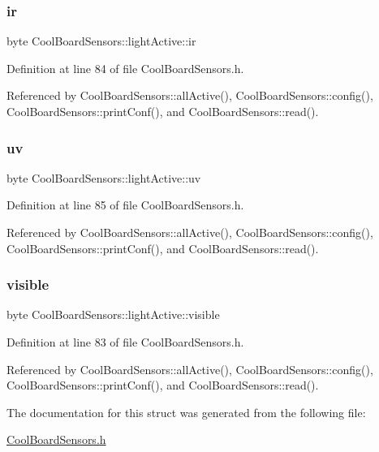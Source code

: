 \subsubsection{\texorpdfstring{ir}{ir}}
{\footnotesize\ttfamily byte Cool\+Board\+Sensors\+::light\+Active\+::ir}



Definition at line 84 of file Cool\+Board\+Sensors.\+h.



Referenced by Cool\+Board\+Sensors\+::all\+Active(), Cool\+Board\+Sensors\+::config(), Cool\+Board\+Sensors\+::print\+Conf(), and Cool\+Board\+Sensors\+::read().

\mbox{\label{structCoolBoardSensors_1_1lightActive_a949a7aaf5166d981de8fe0fd93da20d6}} 
\subsubsection{\texorpdfstring{uv}{uv}}
{\footnotesize\ttfamily byte Cool\+Board\+Sensors\+::light\+Active\+::uv}



Definition at line 85 of file Cool\+Board\+Sensors.\+h.



Referenced by Cool\+Board\+Sensors\+::all\+Active(), Cool\+Board\+Sensors\+::config(), Cool\+Board\+Sensors\+::print\+Conf(), and Cool\+Board\+Sensors\+::read().

\mbox{\label{structCoolBoardSensors_1_1lightActive_abcbba296b6a95e67c0cd2555d9dd50c7}} 
\subsubsection{\texorpdfstring{visible}{visible}}
{\footnotesize\ttfamily byte Cool\+Board\+Sensors\+::light\+Active\+::visible}



Definition at line 83 of file Cool\+Board\+Sensors.\+h.



Referenced by Cool\+Board\+Sensors\+::all\+Active(), Cool\+Board\+Sensors\+::config(), Cool\+Board\+Sensors\+::print\+Conf(), and Cool\+Board\+Sensors\+::read().



The documentation for this struct was generated from the following file\+:\begin{DoxyCompactItemize}
\item 
\hyperlink{CoolBoardSensors_8h}{Cool\+Board\+Sensors.\+h}\end{DoxyCompactItemize}
